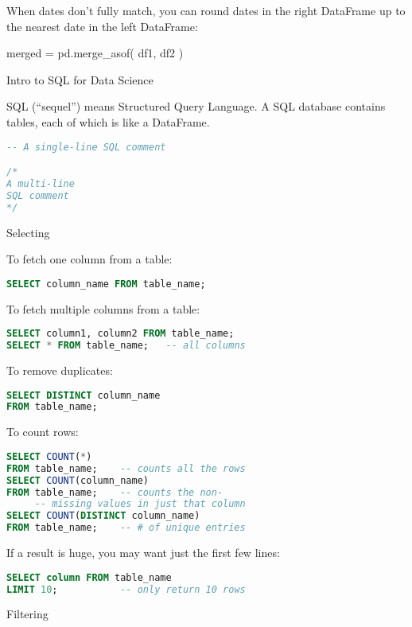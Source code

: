 \documentclass[a4paper,landscape,columns=3]{cheatsheet}
\def\chap#1{\vspace{5mm}\begin{tcolorbox}[colback=red!5!white,colframe=red!75!black,leftrule=3mm]
    \Large #1
\end{tcolorbox}}
\def\sect#1{\begin{tcolorbox}[colback=blue!5!white,colframe=blue!75!black,size=title,leftrule=2mm]
    \large #1
\end{tcolorbox}}
\begin{document}
When dates don't fully match, you can round dates in the right DataFrame up to the nearest date in the left DataFrame:
\begin{python}
merged = pd.merge_asof( df1, df2 )
\end{python}

\chap{Intro to SQL for Data Science}

SQL (``sequel'') means Structured Query Language.  A SQL database contains tables, each of which is like a DataFrame.

\begin{lstlisting}[language=sql,frame=single,rulecolor=\color{gray}]
-- A single-line SQL comment

/*
A multi-line
SQL comment
*/
\end{lstlisting}

\sect{Selecting}

To fetch one column from a table:
\begin{lstlisting}[language=sql,frame=single,rulecolor=\color{gray}]
SELECT column_name FROM table_name;
\end{lstlisting}

To fetch multiple columns from a table:
\begin{lstlisting}[language=sql,frame=single,rulecolor=\color{gray}]
SELECT column1, column2 FROM table_name;
SELECT * FROM table_name;   -- all columns
\end{lstlisting}

To remove duplicates:
\begin{lstlisting}[language=sql,frame=single,rulecolor=\color{gray}]
SELECT DISTINCT column_name
FROM table_name;
\end{lstlisting}

To count rows:
\begin{lstlisting}[language=sql,frame=single,rulecolor=\color{gray}]
SELECT COUNT(*)
FROM table_name;    -- counts all the rows
SELECT COUNT(column_name)
FROM table_name;    -- counts the non-
     -- missing values in just that column
SELECT COUNT(DISTINCT column_name)
FROM table_name;    -- # of unique entries
\end{lstlisting}

If a result is huge, you may want just the first few lines:
\begin{lstlisting}[language=sql,frame=single,rulecolor=\color{gray}]
SELECT column FROM table_name
LIMIT 10;           -- only return 10 rows
\end{lstlisting}

\sect{Filtering}
\end{document}
